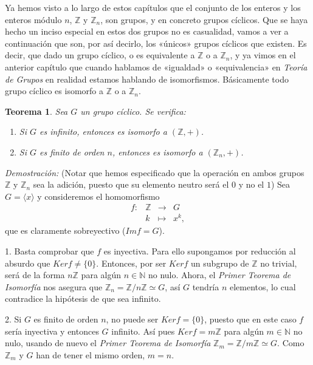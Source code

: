 \documentclass[12pt]{article}
\newtheorem{theorem}{Teorema}[section]
\begin{document}
Ya hemos visto a lo largo de estos capítulos que el conjunto de los enteros y los enteros módulo $n$, $\mathbb{Z}$ y $\mathbb{Z}_{n}$, son grupos, y en concreto grupos cíclicos. Que se haya hecho un inciso especial en estos dos grupos no es casualidad, vamos a ver a continuación que son, por así decirlo, los «únicos» grupos cíclicos que existen. Es decir, que dado un grupo cíclico, o es equivalente a $\mathbb{Z}$ o a $\mathbb{Z}_{n}$, y ya vimos en el anterior capítulo que cuando hablamos de «igualdad» o «equivalencia» en \textit{Teoría de Grupos} en realidad estamos hablando de isomorfismos. Básicamente todo grupo cíclico es isomorfo a $\mathbb{Z}$ o a $\mathbb{Z}_{n}$.

\begin{theorem}
Sea $G$ un grupo cíclico. Se verifica:
\begin{enumerate}
\item Si $G$ es infinito, entonces es isomorfo a $(\mathbb{Z},+)$.
\item Si $G$ es finito de orden $n$, entonces es isomorfo a $(\mathbb{Z}_{n},+)$.
\end{enumerate}
\end{theorem}
\emph{Demostración: }(Notar que hemos especificado que la operación en ambos grupos $\mathbb{Z}$ y $\mathbb{Z}_{n}$ sea la adición, puesto que su elemento neutro será el $0$ y no el $1$)
Sea $G = \langle x \rangle$ y consideremos el homomorfismo $$\begin{array}{rccl}
f\colon &\mathbb{Z}& \longrightarrow &G\\
&k& \longmapsto &x^{k},
\end{array}
$$ que es claramente sobreyectivo ($Im f = G$).

1. Basta comprobar que $f$ es inyectiva. Para ello supongamos por reducción al absurdo que $Ker f \neq \lbrace 0\rbrace$. Entonces, por ser $Ker f$ un subgrupo de $\mathbb{Z}$ no trivial, será de la forma $n\mathbb{Z}$ para algún $n \in \mathbb{N}$ no nulo. Ahora, el \textit{Primer Teorema de Isomorfía} nos asegura que $\mathbb{Z}_{n} = \mathbb{Z}/n\mathbb{Z} \simeq G$, así $G$ tendría $n$ elementos, lo cual contradice la hipótesis de que sea infinito.

2. Si $G$ es finito de orden $n$, no puede ser $Ker f = \lbrace 0 \rbrace$, puesto que en este caso $f$ sería  inyectiva y entonces $G$ infinito. Así pues $Ker f = m\mathbb{Z}$ para algún $m \in \mathbb{N}$ no nulo, usando de nuevo el \textit{Primer Teorema de Isomorfía} $\mathbb{Z}_{m} = \mathbb{Z}/m\mathbb{Z} \simeq G$. Como $\mathbb{Z}_{m}$ y $G$ han de tener el mismo orden, $m=n$.
\end{document}
